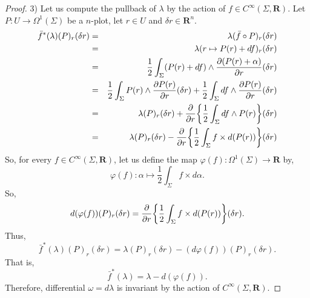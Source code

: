 \documentclass[10pt,reqno,twoside]{amsart}
\newcommand{\RR}{\mathbf{R}}
\newcommand{\Cinfty}{C^\infty}
\newcommand{\undemi}{\frac{1}{2}}
\theoremstyle{plain}
\theoremstyle{definition}
\begin{document}
\begin{proof}
    3) Let us compute the pullback of $\lambda$ by the action of $f \in \Cinfty(\Sigma,\RR)$.
    Let $P : U \to \Omega^1(\Sigma)$ be a $n$-plot,
    let $r \in U$ and $\delta r \in \RR^n$.
    \begin{eqnarray*}
      \bar f^*(\lambda)(P)_r(\delta r) & = & \lambda( \bar f \circ P)_r(\delta r) \\
      & = & \lambda(r \mapsto P (r) + df)_r (\delta r) \\
      & = & \undemi \int_\Sigma (P (r) + df) \wedge {\partial (P (r) +\alpha) \over \partial r}(\delta r)\\ & = & \undemi \int_\Sigma P (r) \wedge {\partial P (r)\over \partial r}(\delta r) + \undemi \int_\Sigma df \wedge {\partial P (r) \over \partial r}(\delta r) \\
      & = & \lambda(P)_r(\delta r) + {\partial \over \partial r} \bigg\{\undemi \int_\Sigma df \wedge P (r)\bigg\}(\delta r) \\
      & = & \lambda(P)_r(\delta r) - {\partial \over \partial r}\bigg\{ \undemi \int_\Sigma f \times d(P (r))\bigg\}(\delta r) \\
    \end{eqnarray*}
    So,
    for every $f \in \Cinfty(\Sigma,\RR)$,
    let us define the map $\varphi(f) : \Omega^1(\Sigma) \to \RR$ by,
    $$
      \varphi(f) : \alpha \mapsto \undemi \int_\Sigma f \times d\alpha.
      $$
    So,
    $$
      d(\varphi(f))(P)_r(\delta r) = {\partial \over \partial r} \bigg\{ \undemi \int_\Sigma f \times d(P (r)) \bigg\}(\delta r).
      $$
    Thus,
    $$
      \bar f^*(\lambda)(P)_r(\delta r) = \lambda(P)_r(\delta r) - (d\varphi(f))(P)_r(\delta r).
      $$
    That is,
    $$
      \bar f^*(\lambda) = \lambda - d(\varphi(f)).
      $$
    Therefore,
    differential $\omega = d\lambda$ is invariant by the action of $\Cinfty(\Sigma,\RR)$.
    

\end{proof}
\end{document}
